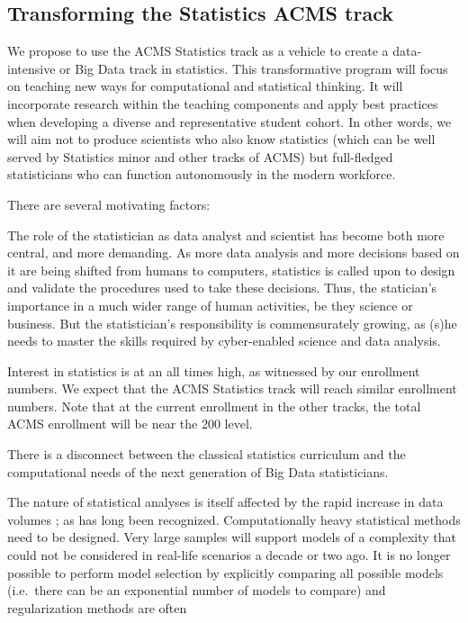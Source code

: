 \subsection{Transforming the Statistics  ACMS track}
We propose to use the ACMS Statistics track as a vehicle to create a
data-intensive or Big Data track in statistics. This transformative
program will focus on teaching new ways for computational and
statistical thinking. It will incorporate research within the teaching
components and apply best practices when developing a diverse and
representative student cohort.  In other words, we will aim not to
produce scientists who also know statistics (which can be well served
by Statistics minor and other tracks of ACMS) but full-fledged
statisticians who can function autonomously in the modern workforce.

There are several motivating factors:
\bit
\item The role of
 the statistician as data analyst and scientist has become both more central, and
 more demanding. As more data analysis and more decisions based on it
 are being shifted from humans to computers, statistics is called
 upon to design and validate the procedures used to take these
 decisions. Thus, the statician's importance in a much wider range of
 human activities, be they science or business. But the
 statistician's responsibility is commensurately growing, as (s)he needs
 to master the skills required by cyber-enabled science and data
 analysis.
\item Interest in statistics is at an all times high, as witnessed by
  our enrollment numbers. We expect that the ACMS Statistics track
  will reach similar enrollment numbers. Note that at the current
  enrollment in the other tracks, the total ACMS enrollment will be
  near the 200 level.
\item There is a disconnect between the classical statistics
  curriculum and the computational needs of the next generation of Big
  Data statisticians. 
\item The nature of statistical analyses is itself affected by the
  rapid increase in data volumes \cite{friedman:97}; as has 
  long been recognized. Computationally heavy statistical methods need to
  be designed. Very large samples will support models of a complexity
  that could not be considered in real-life scenarios a decade or two
  ago. It is no longer possible to perform model selection by explicitly
  comparing all possible models (i.e.\ there can be an exponential
  number of models to compare) and regularization methods are often
